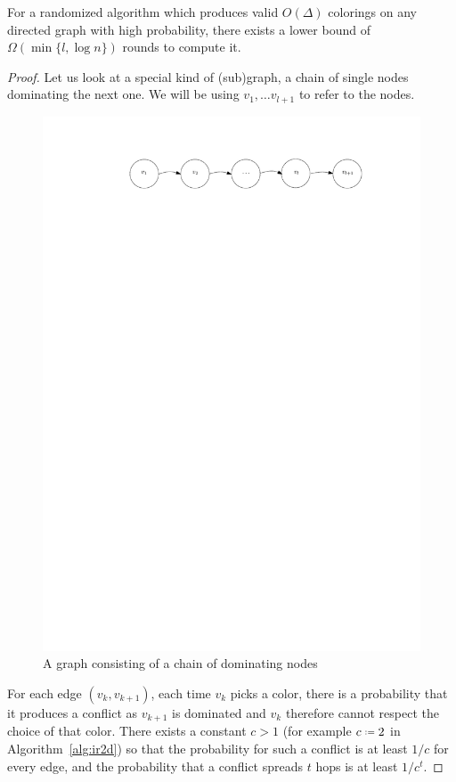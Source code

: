 \begin{theorem}\label{theorem:lowerbound}
For a randomized algorithm which produces valid $O(\Delta)$ colorings on any directed graph with high probability, there exists a lower bound of $\Omega (\min\{l, \log n\})$ rounds to compute it.

\end{theorem}
\begin{proof}
Let us look at a special kind of (sub)graph, a chain of single nodes dominating the next one. We will be using $v_1, \dots v_{l+1}$ to refer to the nodes.

\begin{figure}[ht]
\center
\includegraphics{figures/chain.pdf}
\caption{A graph consisting of a chain of dominating nodes}
\end{figure}

For each edge $(v_k, v_{k+1})$, each time $v_k$ picks a color, there is a probability that it produces a conflict as $v_{k+1}$ is dominated and $v_k$ therefore cannot respect the choice of that color. There exists a constant $c>1$ (for example $c \defines 2$ in Algorithm~\ref{alg:ir2d}) so that the probability for such a conflict is at least $1/c$ for every edge, and the probability that a conflict spreads $t$ hops is at least $1/c^t$.


\end{proof}
